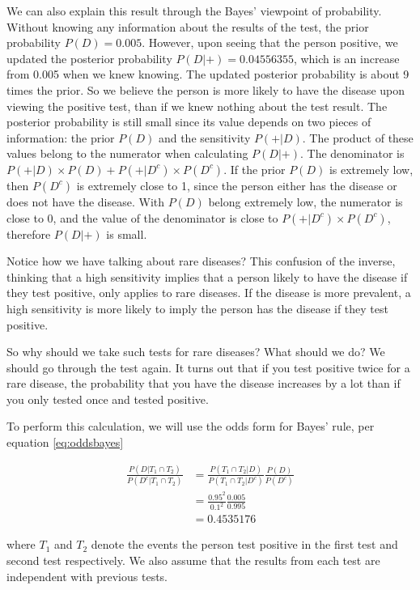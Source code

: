 \documentclass[
]{book}
\begin{document}
We can also explain this result through the Bayes' viewpoint of probability. Without knowing any information about the results of the test, the prior probability \(P(D) = 0.005\). However, upon seeing that the person positive, we updated the posterior probability \(P(D|+) = 0.04556355\), which is an increase from 0.005 when we knew knowing. The updated posterior probability is about 9 times the prior. So we believe the person is more likely to have the disease upon viewing the positive test, than if we knew nothing about the test result. The posterior probability is still small since its value depends on two pieces of information: the prior \(P(D)\) and the sensitivity \(P(+|D)\). The product of these values belong to the numerator when calculating \(P(D|+)\). The denominator is \(P(+|D) \times P(D) + P(+|D^c) \times P(D^c)\). If the prior \(P(D)\) is extremely low, then \(P(D^c)\) is extremely close to 1, since the person either has the disease or does not have the disease. With \(P(D)\) belong extremely low, the numerator is close to 0, and the value of the denominator is close to \(P(+|D^c) \times P(D^c)\), therefore \(P(D|+)\) is small.

Notice how we have talking about rare diseases? This confusion of the inverse, thinking that a high sensitivity implies that a person likely to have the disease if they test positive, only applies to rare diseases. If the disease is more prevalent, a high sensitivity is more likely to imply the person has the disease if they test positive.

So why should we take such tests for rare diseases? What should we do? We should go through the test again. It turns out that if you test positive twice for a rare disease, the probability that you have the disease increases by a lot than if you only tested once and tested positive.

To perform this calculation, we will use the odds form for Bayes' rule, per equation \eqref{eq:oddsbayes}

\[
\begin{split}
\frac{P(D|T_1 \cap T_2)}{P(D^c|T_1 \cap T_2)} &= \frac{P(T_1 \cap T_2 | D)}{P(T_1 \cap T_2 | D^c)} \frac{P(D)}{P(D^c)}\\
 &= \frac{0.95^2}{0.1^2} \frac{0.005}{0.995} \\
&= 0.4535176
\end{split}
\]

where \(T_1\) and \(T_2\) denote the events the person test positive in the first test and second test respectively. We also assume that the results from each test are independent with previous tests.
\end{document}
